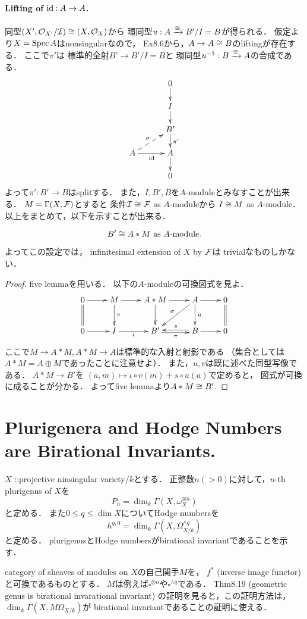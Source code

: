 \documentclass[a4paper]{jsarticle}
\newcommand{\Der}{\Omega}
\newcommand{\shCano}{\omega}
\begin{document}
    \paragraph{Lifting of $\mathrm{id}_{\!}: A \to A$.}
    同型$(X', \mathcal{O}_{X'}/\mathcal{I}) \cong (X, \mathcal{O}_X)$から
    環同型$u: A \xrightarrow{\cong} B'/I=B$が得られる．
    仮定より$X=\operatorname{Spec} A$はnonsingularなので，
    Ex8.6から，$A \to A \cong B$のliftingが存在する．
    ここで$\pi'$は
    標準的全射$B' \to B'/I=B$と
    環同型$u^{-1}: B \xrightarrow{\cong} A$の合成である．
    \[
    \xymatrix@R=15pt@C=30pt
    {
        {}   & 0 \ar[d]\\
        {}   & I \ar[d]\\
        {}   & B' \ar[d]^-{\pi'}\\
        A \ar[r]_-{\id}\ar@{-->}[ru]^-{\sigma}& A \ar[d]\\
        {} & 0 \\
    }
    \]
    よって$\pi': B' \to B$はsplitする．
    また，$I, B', B$を$A$-moduleとみなすことが出来る．
    $M=\Gamma(X, \mathcal{F})$とすると
    条件$\mathcal{I} \cong \mathcal{F}$ as $A$-moduleから
    $I \cong M$ as $A$-module．
    以上をまとめて，以下を示すことが出来る．
    \begin{Claim}
        \[ B' \cong A \ast M \text{ as $A$-module}. \]
    \end{Claim}
    よってこの設定では，
    infinitesimal extension of $X$ by $\mathcal{F}$は
    trivialなものしかない．
    \begin{proof}
        five lemmaを用いる．
        以下の$A$-moduleの可換図式を見よ．
        \[
        \xymatrix
        {
            0 \ar[r]\ar@{=}[d]& M \ar[r]\ar[d]^-{v}&
            A \ast M \ar[r]\ar[d]& A \ar[r]\ar[d]^-{u}\ar[ld]_-{\sigma}& 0 \ar@{=}[d]\\
            0 \ar[r]& I \ar[r]_-{\iota}& B' \ar@<-1.5pt>[r]_-{\pi}& B \ar[r]\ar@<-1.5pt>[l]_-{s}& 0
        }
        \]
        ここで$M \to A \ast M, A \ast M \to A$は標準的な入射と射影である
        （集合としては$A \ast M=A \oplus M$であったことに注意せよ）．
        また，$u,v$は既に述べた同型写像である．
        $A \ast M \to B'$を
        $(a,m) \mapsto \iota \circ v(m)+s \circ u(a)$で定めると，
        図式が可換に成ることが分かる．
        よってfive lemmaより$A \ast M \cong B'$.
    \end{proof}
    
\section{Plurigenera and Hodge Numbers are Birational Invariants.} %
    $X$ ::projective ninsingular variety/$k$とする．
    正整数$n(>0)$に対して，$n$-th plurigenus of $X$を
    \[ P_n=\dim_k \Gamma(X, \shCano_X^{\otimes n}) \]
    と定める．
    また$0 \leq q \leq \dim X$についてHodge numbersを
    \[ h^{q,0}=\dim_k \Gamma(X, \Der_{X/k}^{\wedge q}) \]
    と定める．
    plurigenusとHodge numbersがbirational invariantであることを示す．

    category of sheaves of modules on $X$の自己関手$M$を，
    $f^*$ (inverse image functor)と可換であるものとする．
    $M$は例えば$\square^{\otimes n}$や$\square^{\wedge q}$である．
    Thm8.19 (geometric genus is birational invarational invariant)
    の証明を見ると，この証明方法は，
    $\dim_k \Gamma(X, M \Der_{X/k})$が
    birational invariantであることの証明に使える．
\end{document}
